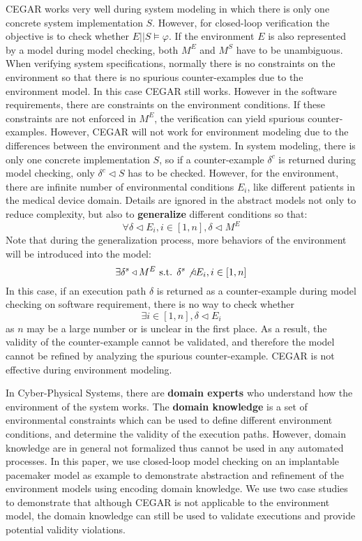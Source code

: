 CEGAR works very well during system modeling in which there is only one concrete system implementation $S$. However, for closed-loop verification the objective is to check whether $E||S\models\varphi$. If the environment $E$ is also represented by a model during model checking, both $M^E$ and $M^S$ have to be unambiguous. When verifying system specifications, normally there is no constraints on the environment so that there is no spurious counter-examples due to the environment model. In this case CEGAR still works. However in the software requirements, there are constraints on the environment conditions. If these constraints are not enforced in $M^E$, the verification can yield spurious counter-examples. However, CEGAR will not work for environment modeling due to the differences between the environment and the system. In system modeling, there is only one concrete implementation $S$, so if a counter-example $\delta^c$ is returned during model checking, only $\delta^c\triangleleft S$ has to be checked. However, for the environment, there are infinite number of environmental conditions $E_i$, like different patients in the medical device domain. Details are ignored in the abstract models not only to reduce complexity, but also to \textbf{generalize} different conditions so that:
$$\forall \delta\triangleleft E_i, i\in [1,n],\delta\triangleleft M^E$$
Note that during the generalization process, more behaviors of the environment will be introduced into the model: 
$$\exists\delta^s\triangleleft M^E \text{ s.t. } \delta^s\not\triangleleft E_i, i\in [1,n]$$
In this case, if an execution path $\delta$ is returned as a counter-example during model checking on software requirement, there is no way to check whether 
$$\exists i\in[1,n],\delta\triangleleft E_i$$ 
as $n$ may be a large number or is unclear in the first place. As a result, the validity of the counter-example cannot be validated, and therefore the model cannot be refined by analyzing the spurious counter-example. CEGAR is not effective during environment modeling.

In Cyber-Physical Systems, there are \textbf{domain experts} who understand how the environment of the system works. The \textbf{domain knowledge} is a set of environmental constraints which can be used to define different environment conditions, and determine the validity of the execution paths. However, domain knowledge are in general not formalized thus cannot be used in any automated processes. In this paper, we use closed-loop model checking on an implantable pacemaker model as example to demonstrate abstraction and refinement of the environment models using encoding domain knowledge. We use two case studies to demonstrate that although CEGAR is not applicable to the environment model, the domain knowledge can still be used to validate executions and provide potential validity violations.

